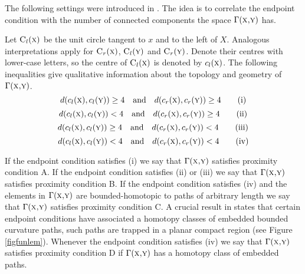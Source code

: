 \documentclass{amsart}
\theoremstyle{definition}
\theoremstyle{remark}
\numberwithin{equation}{section}
\begin{document}
The following settings were introduced in \cite{paperc}. The idea is to correlate the endpoint condition with the number of connected components the space $\Gamma(\mbox{\sc x,y})$ has. 

Let $\mbox{\sc C}_ l(\mbox{\sc x})$ be the unit circle tangent to $x$ and to the left of $X$. Analogous interpretations apply for $\mbox{\sc C}_ r(\mbox{\sc x})$, $\mbox{\sc C}_ l(\mbox{\sc y})$ and $\mbox{\sc C}_ r(\mbox{\sc y})$.  Denote their centres with lower-case letters, so the centre of $\mbox{\sc C}_ l(\mbox{\sc x})$ is denoted by $c_l(\mbox{\sc x})$. The following inequalities give qualitative information about the topology and geometry of $\Gamma(\mbox{\sc x,y})$.
\begin{equation} d(c_l(\mbox{\sc x}),c_l(\mbox{\sc y}))\geq 4 \quad \mbox{and}\quad d(c_r(\mbox{\sc x}),c_r(\mbox{\sc y}))\geq4 \label{con_a}\tag{i}\end{equation}
 \begin{equation} d(c_l(\mbox{\sc x}),c_l(\mbox{\sc y}))< 4 \quad \mbox{and}\quad d(c_r(\mbox{\sc x}),c_r(\mbox{\sc y}))\geq 4 \label{con_b}\tag{ii} \end{equation}
  \begin{equation} d(c_l(\mbox{\sc x}),c_l(\mbox{\sc y}))\geq4 \quad \mbox{and}\quad d(c_r(\mbox{\sc x}),c_r(\mbox{\sc y}))< 4  \label{con_b'}\tag{iii} \end{equation}
   \begin{equation} d(c_l(\mbox{\sc x}),c_l(\mbox{\sc y}))< 4 \quad \mbox{and}\quad d(c_r(\mbox{\sc x}),c_r(\mbox{\sc y}))< 4 \label{con_c}\tag{iv} \end{equation}

If the endpoint condition satisfies (i) we say that $\Gamma({\mbox{\sc x,y}})$ satisfies proximity condition {\sc A}. If the endpoint condition satisfies (ii) or (iii) we say that $\Gamma({\mbox{\sc x,y}})$ satisfies proximity condition {\sc B}. If the endpoint condition satisfies (iv) and the elements in $\Gamma({\mbox{\sc x,y}})$ are bounded-homotopic to paths of arbitrary length we say that $\Gamma({\mbox{\sc x,y}})$ satisfies proximity condition {\sc C}. A crucial result in \cite{paperc} states that certain endpoint conditions have associated a homotopy classes of embedded bounded curvature paths, such paths are trapped in a planar compact region (see Figure \ref{figfunlem}). Whenever the endpoint condition satisfies (iv) we say that $\Gamma({\mbox{\sc x,y}})$ satisfies proximity condition {\sc D} if $\Gamma({\mbox{\sc x,y}})$ has a homotopy class of embedded paths. 
\end{document}
